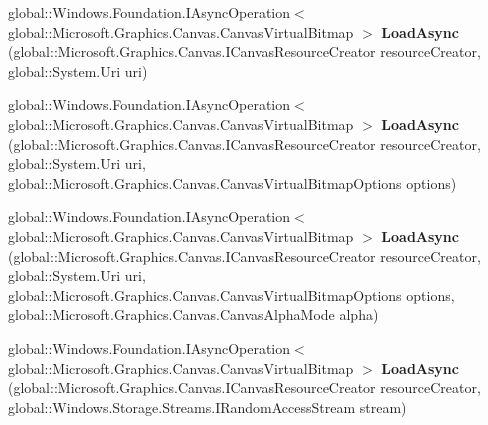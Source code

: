\begin{DoxyCompactItemize}
global\+::\+Windows.\+Foundation.\+I\+Async\+Operation$<$ global\+::\+Microsoft.\+Graphics.\+Canvas.\+Canvas\+Virtual\+Bitmap $>$ {\bfseries Load\+Async} (global\+::\+Microsoft.\+Graphics.\+Canvas.\+I\+Canvas\+Resource\+Creator resource\+Creator, global\+::\+System.\+Uri uri)
\item 
\mbox{\label{interface_microsoft_1_1_graphics_1_1_canvas_1_1_i_canvas_virtual_bitmap_statics_ae4cad80705e97acdc853863be82a2edd}} 
global\+::\+Windows.\+Foundation.\+I\+Async\+Operation$<$ global\+::\+Microsoft.\+Graphics.\+Canvas.\+Canvas\+Virtual\+Bitmap $>$ {\bfseries Load\+Async} (global\+::\+Microsoft.\+Graphics.\+Canvas.\+I\+Canvas\+Resource\+Creator resource\+Creator, global\+::\+System.\+Uri uri, global\+::\+Microsoft.\+Graphics.\+Canvas.\+Canvas\+Virtual\+Bitmap\+Options options)
\item 
\mbox{\label{interface_microsoft_1_1_graphics_1_1_canvas_1_1_i_canvas_virtual_bitmap_statics_ac1747ce10fe0cd80d92ea79b088c0fa3}} 
global\+::\+Windows.\+Foundation.\+I\+Async\+Operation$<$ global\+::\+Microsoft.\+Graphics.\+Canvas.\+Canvas\+Virtual\+Bitmap $>$ {\bfseries Load\+Async} (global\+::\+Microsoft.\+Graphics.\+Canvas.\+I\+Canvas\+Resource\+Creator resource\+Creator, global\+::\+System.\+Uri uri, global\+::\+Microsoft.\+Graphics.\+Canvas.\+Canvas\+Virtual\+Bitmap\+Options options, global\+::\+Microsoft.\+Graphics.\+Canvas.\+Canvas\+Alpha\+Mode alpha)
\item 
\mbox{\label{interface_microsoft_1_1_graphics_1_1_canvas_1_1_i_canvas_virtual_bitmap_statics_aee81585da1cf32d9da0d24e264902778}} 
global\+::\+Windows.\+Foundation.\+I\+Async\+Operation$<$ global\+::\+Microsoft.\+Graphics.\+Canvas.\+Canvas\+Virtual\+Bitmap $>$ {\bfseries Load\+Async} (global\+::\+Microsoft.\+Graphics.\+Canvas.\+I\+Canvas\+Resource\+Creator resource\+Creator, global\+::\+Windows.\+Storage.\+Streams.\+I\+Random\+Access\+Stream stream)
\item 
\mbox{\label{interface_microsoft_1_1_graphics_1_1_canvas_1_1_i_canvas_virtual_bitmap_statics_afcb7bb816ebb415ed059fda157c6bdca}} 

\end{DoxyCompactItemize}
